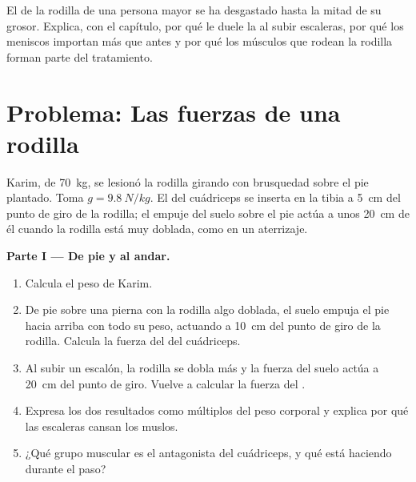 \begin{exercise}[$\star\star\star$]\label{exo:g10:muscles-and-joints:15}
El  de la rodilla de una persona mayor se ha desgastado hasta
la mitad de su grosor. Explica, con el capítulo, por qué le duele la
 al subir escaleras, por qué los meniscos importan más que
antes y por qué los músculos que rodean la rodilla forman parte del
tratamiento.
\end{exercise}

\section{Problema: Las fuerzas de una rodilla}

\begin{problem}
\label{pb:g10:muscles-and-joints:1}
Karim, de \qty{70}{kg}, se lesionó la rodilla girando con brusquedad
sobre el pie plantado. Toma $g = \qty{9.8}{N/kg}$. El  del
cuádriceps se inserta en la tibia a \qty{5}{cm} del punto de giro de la
rodilla; el empuje del suelo sobre el pie actúa a unos \qty{20}{cm} de
él cuando la rodilla está muy doblada, como en un aterrizaje.

\medskip
\noindent\textbf{Parte I --- De pie y al andar.}
\begin{enumerate}
  \item Calcula el peso de Karim.
  \item De pie sobre una pierna con la rodilla algo doblada, el suelo
        empuja el pie hacia arriba con todo su peso, actuando a
        \qty{10}{cm} del punto de giro de la rodilla. Calcula la fuerza
        del  del cuádriceps.
  \item Al subir un escalón, la rodilla se dobla más y la fuerza del
        suelo actúa a \qty{20}{cm} del punto de giro. Vuelve a calcular
        la fuerza del .
  \item Expresa los dos resultados como múltiplos del peso corporal y
        explica por qué las escaleras cansan los muslos.
  \item ¿Qué grupo muscular es el antagonista del cuádriceps, y qué
        está haciendo durante el paso?
\end{enumerate}


\end{problem}
